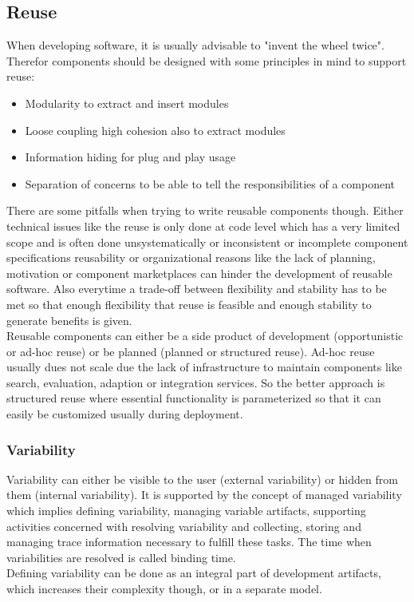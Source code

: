 \subsection{Reuse}
When developing software, it is usually advisable to "invent the wheel twice".
Therefor components should be designed with some principles in mind to support reuse:
\begin{itemize}
  \item Modularity to extract and insert modules
  \item Loose coupling high cohesion also to extract modules
  \item Information hiding for plug and play usage
  \item Separation of concerns to be able to tell the responsibilities of a component
\end{itemize}
There are some pitfalls when trying to write reusable components though.
Either technical issues like the reuse is only done at code level which has a very limited scope and is often done unsystematically  or inconsistent or incomplete component specifications reusability or organizational reasons like the lack of planning, motivation or component marketplaces can hinder the development of reusable software.
Also everytime a trade-off between flexibility and stability has to be met so that enough flexibility that reuse is feasible and enough stability to generate benefits is given.\\
Reusable components can either be a side product of development (opportunistic or ad-hoc reuse) or be planned (planned or structured reuse).
Ad-hoc reuse usually dues not scale due the lack of infrastructure to maintain components like search, evaluation, adaption or integration services.
So the better approach is structured reuse where essential functionality is parameterized so that it can easily be customized usually during deployment.\\

\subsubsection{Variability}
Variability can either be visible to the user (external variability) or hidden from them (internal variability).
It is supported by the concept of managed variability which implies defining variability, managing variable artifacts, supporting activities concerned with resolving variability and collecting, storing and managing trace information necessary to fulfill these tasks.
The time when variabilities are resolved is called binding time.\\
Defining variability can be done as an integral part of development artifacts, which increases their complexity though, or in a separate model.

